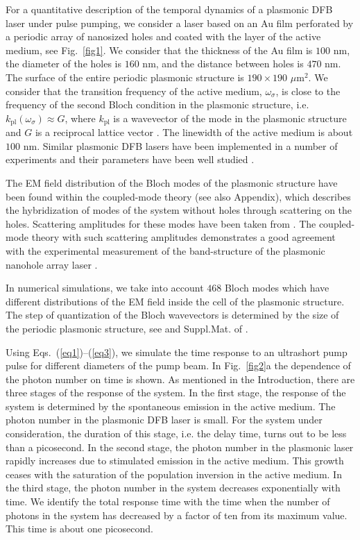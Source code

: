 \documentclass[aps,prapplied,amsmath,amssymb,onecolumn,superscriptaddress,showpacs,floatfix,longbibliography]{revtex4-1}
\begin{document}
For a quantitative description of the temporal dynamics of a plasmonic DFB laser under pulse pumping, we consider a laser based on an Au film perforated by a periodic array of nanosized holes and coated with the layer of the active medium, see Fig.~\ref{fig1}. We consider that the thickness of the Au film is $100$ $\text{nm}$, the diameter of the holes is $160$ $\text{nm}$, and the distance between holes is $470$ $\text{nm}$. The surface of the entire periodic plasmonic structure is $190 \times 190$ $\mu \text{m}^2$. We consider that the transition frequency of the active medium, $\omega_{\sigma}$, is close to the frequency of the second Bloch condition in the plasmonic structure, i.e. $k_\text{pl}(\omega_{\sigma}) \approx G$, where $k_\text{pl}$ is a wavevector of the mode in the plasmonic structure and $G$ is a reciprocal lattice vector \cite{TennerJOpt,TennerACSPhot,nefedkin2018acsphot}. The linewidth of the active medium is about $100$ $\text{nm}$. Similar plasmonic DFB lasers have been implemented in a number of experiments \cite{BeijnumPRL,TennerJOpt,TennerACSPhot} and their parameters have been well studied \cite{BeijnumPRL,TennerJOpt,TennerACSPhot,nefedkin2018acsphot}.

The EM field distribution of the Bloch modes of the plasmonic structure have been found within the coupled-mode theory \cite{TennerJOpt,TennerACSPhot,nefedkin2018acsphot} (see also Appendix), which describes the hybridization of modes of the system without holes through scattering on the holes. Scattering amplitudes for these modes have been taken from \cite{TennerJOpt,TennerACSPhot}. The coupled-mode theory with such scattering amplitudes demonstrates a good agreement with the experimental measurement of the band-structure of the plasmonic nanohole array laser \cite{TennerJOpt,TennerACSPhot}.

In numerical simulations, we take into account $468$ Bloch modes which have different distributions of the EM field inside the cell of the plasmonic structure. The step of quantization of the Bloch wavevectors is determined by the size of the periodic plasmonic structure, see \cite{nefedkin2018acsphot} and Suppl.Mat. of \cite{nefedkin2018acsphot}.

Using Eqs.~(\ref{eq1})--(\ref{eq3}), we simulate the time response to an ultrashort pump pulse for different diameters of the pump beam.
In Fig.~\ref{fig2}a the dependence of the photon number on time is shown.
As mentioned in the Introduction, there are three stages of the response of the system.
In the first stage, the response of the system is determined by the spontaneous emission in the active medium.
The photon number in the plasmonic DFB laser is small.
For the system under consideration, the duration of this stage, i.e. the delay time, turns out to be less than a picosecond.
In the second stage, the photon number in the plasmonic laser rapidly increases due to stimulated emission in the active medium.
This growth ceases with the saturation of the population inversion in the active medium.
In the third stage, the photon number in the system decreases exponentially with time.
We identify the total response time with the time when the number of photons in the system has decreased by a factor of ten from its maximum value.
This time is about one picosecond.
  
\end{document}
